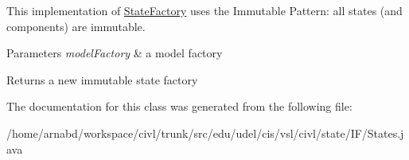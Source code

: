 This implementation of \hyperlink{interfaceedu_1_1udel_1_1cis_1_1vsl_1_1civl_1_1state_1_1IF_1_1StateFactory}{State\+Factory} uses the Immutable Pattern\+: all states (and components) are immutable.


\begin{DoxyParams}{Parameters}
{\em model\+Factory} & a model factory \\
\hline
\end{DoxyParams}
\begin{DoxyReturn}{Returns}
a new immutable state factory 
\end{DoxyReturn}


The documentation for this class was generated from the following file\+:\begin{DoxyCompactItemize}
\item 
/home/arnabd/workspace/civl/trunk/src/edu/udel/cis/vsl/civl/state/\+I\+F/States.\+java\end{DoxyCompactItemize}

